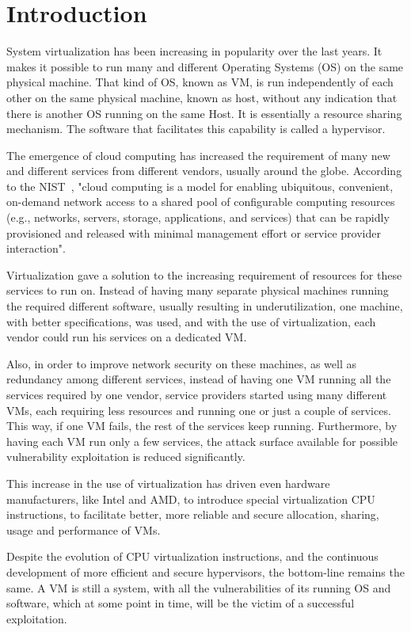 \chapter{Introduction}\label{ch:intro}

System virtualization has been increasing in popularity over the last years. It makes it possible to run many and different Operating Systems (OS) on the same physical machine. That kind of \ac{OS}, known as \ac{VM}, is run independently of each other on the same physical machine, known as host, without any indication that there is another \ac{OS} running on the same Host. It is essentially a resource sharing mechanism. The software that facilitates this capability is called a hypervisor.
\par The emergence of cloud computing has increased the requirement of many new and different services from different vendors, usually around the globe. According to the \ac{NIST}~\cite{mell2011nist}, "cloud computing is a model for enabling ubiquitous, convenient, on-demand network access to a shared pool of configurable computing resources (e.g., networks, servers, storage, applications, and services) that can be rapidly provisioned and released with minimal management effort or service provider interaction".  
\par Virtualization gave a solution to the increasing requirement of resources for these services to run on. Instead of having many separate physical machines running the required different software, usually resulting in underutilization, one machine, with better specifications, was used, and with the use of virtualization, each vendor could run his services on a dedicated \ac{VM}. 
\par Also, in order to improve network security on these machines, as well as redundancy among different services, instead of having one VM running all the services required by one vendor, service providers started using many different \ac{VM}s, each requiring less resources and running one or just a couple of services. This way, if one VM fails, the rest of the services keep running. Furthermore, by having each \ac{VM} run only a few services, the attack surface available for possible vulnerability exploitation is reduced significantly.
\par This increase in the use of virtualization has driven even hardware manufacturers, like Intel and AMD, to introduce special virtualization \ac{CPU} instructions, to facilitate better, more reliable and secure allocation, sharing, usage and performance of \ac{VM}s. 
\par Despite the evolution of \ac{CPU} virtualization instructions, and the continuous development of more efficient and secure hypervisors, the bottom-line remains the same. A \ac{VM} is still a system, with all the vulnerabilities of its running \ac{OS} and software, which at some point in time, will be the victim of a successful exploitation. 

